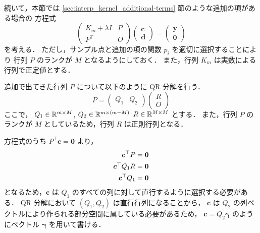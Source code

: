 続いて，本節では \ref{sec:interp_kernel_additional-terms} 節のような追加の項がある場合の
方程式
\begin{equation}
    \begin{pmatrix}
        K_m + \lambda I & P \\
        P^\top          & O
    \end{pmatrix}
    \begin{pmatrix}
        \bm{c} \\ \bm{d}
    \end{pmatrix}
    =
    \begin{pmatrix}
        \bm{y} \\ \bm{0}
    \end{pmatrix}
\end{equation}
を考える．
ただし，サンプル点と追加の項の関数 $p_i$ を適切に選択することにより
行列 $P$ のランクが $M$ となるようにしておく．
また，行列 $K_m$ は実数による行列で正定値とする．

追加で出てきた行列 $P$ について以下のように QR 分解を行う．
\begin{equation}
    P =
    \begin{pmatrix}
        Q_1 & Q_2
    \end{pmatrix}
    \begin{pmatrix}
        R \\ O
    \end{pmatrix}
\end{equation}
ここで，
$Q_1 \in \mathbb{R}^{m \times M}$,
$Q_2 \in \mathbb{R}^{m \times (m-M)}$
$R \in \mathbb{R}^{M \times M}$
とする．
また，行列 $P$ のランクが $M$ としているため，行列 $R$ は正則行列となる．

方程式のうち $P^\top \bm{c} = \bm{0}$ より，
\begin{align}
    \bm{c}^\top P     & = \bm{0} \notag \\
    \bm{c}^\top Q_1 R & = \bm{0} \notag \\
    \bm{c}^\top Q_1   & = \bm{0}
\end{align}
となるため，$\bm{c}$ は $Q_1$ のすべての列に対して直行するように選択する必要がある．
QR 分解において $(Q_1, Q_2)$ は直行行列になることから，
$\bm{c}$ は $Q_2$ の列ベクトルにより作られる部分空間に属している必要があるため，
$\bm{c} = Q_2 \bm{\gamma}$ のようにベクトル $\bm{\gamma}$ を用いて書ける．

